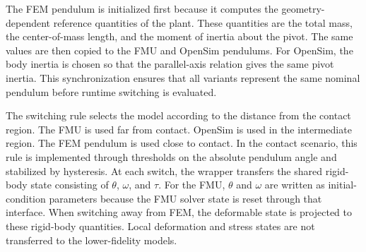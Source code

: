 The \ac{FEM} pendulum is initialized first because it computes the geometry-dependent reference quantities of the plant.
These quantities are the total mass, the center-of-mass length, and the moment of inertia about the pivot.
The same values are then copied to the \ac{FMU} and OpenSim pendulums.
For OpenSim, the body inertia is chosen so that the parallel-axis relation gives the same pivot inertia.
This synchronization ensures that all variants represent the same nominal pendulum before runtime switching is evaluated.

The switching rule selects the model according to the distance from the contact region.
The \ac{FMU} is used far from contact.
OpenSim is used in the intermediate region.
The \ac{FEM} pendulum is used close to contact.
In the contact scenario, this rule is implemented through thresholds on the absolute pendulum angle and stabilized by hysteresis.
At each switch, the wrapper transfers the shared rigid-body state consisting of \(\theta\), \(\omega\), and \(\tau\).
For the \ac{FMU}, \(\theta\) and \(\omega\) are written as initial-condition parameters because the \ac{FMU} solver state is reset through that interface.
When switching away from \ac{FEM}, the deformable state is projected to these rigid-body quantities.
Local deformation and stress states are not transferred to the lower-fidelity models.
